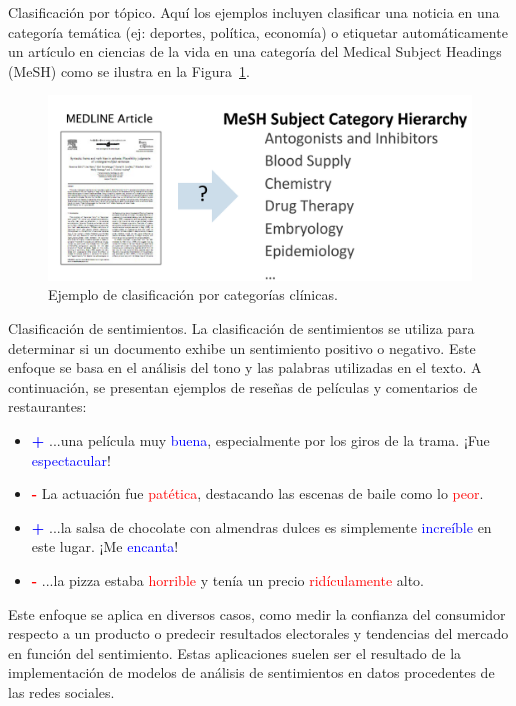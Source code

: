 \begin{example}
Clasificación por tópico. Aquí los ejemplos incluyen clasificar una noticia en una categoría temática (ej: deportes, política, economía) o etiquetar automáticamente un artículo en ciencias de la vida en una categoría del Medical Subject Headings (MeSH) como se ilustra en la Figura~\ref{fig:medarticle}.

\begin{figure}[h]
    \centering
    \includegraphics[scale = 0.2]{pics/medarticle.png}
    \caption{Ejemplo de clasificación por categorías clínicas.}
    \label{fig:medarticle}
\end{figure}



\end{example}



\begin{example}
Clasificación de sentimientos. La clasificación de sentimientos se utiliza para determinar si un documento exhibe un sentimiento positivo o negativo. Este enfoque se basa en el análisis del tono y las palabras utilizadas en el texto. A continuación, se presentan ejemplos de reseñas de películas y comentarios de restaurantes:

\begin{itemize}
    \item \textcolor{blue}{\textbf{+}} ...una película muy \textcolor{blue}{buena}, especialmente por los giros de la trama. ¡Fue \textcolor{blue}{espectacular}!
    \item \textcolor{red}{\textbf{-}} La actuación fue \textcolor{red}{patética}, destacando las escenas de baile como lo \textcolor{red}{peor}.
    \item \textcolor{blue}{\textbf{+}} ...la salsa de chocolate con almendras dulces es simplemente \textcolor{blue}{increíble} en este lugar. ¡Me \textcolor{blue}{encanta}!
    \item \textcolor{red}{\textbf{-}} ...la pizza estaba \textcolor{red}{horrible} y tenía un precio \textcolor{red}{ridículamente} alto.
\end{itemize}

Este enfoque se aplica en diversos casos, como medir la confianza del consumidor respecto a un producto o predecir resultados electorales y tendencias del mercado en función del sentimiento. Estas aplicaciones suelen ser el resultado de la implementación de modelos de análisis de sentimientos en datos procedentes de las redes sociales.
\end{example}




